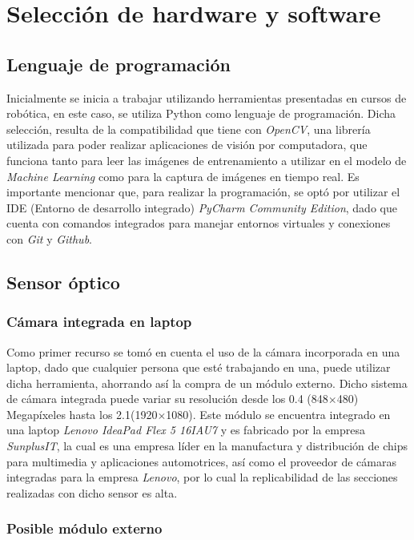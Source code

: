 \chapter{Selección de hardware y software}

\section{Lenguaje de programación}
Inicialmente se inicia a trabajar utilizando herramientas presentadas en cursos de robótica, en este caso, se utiliza Python como lenguaje de programación. Dicha selección, resulta de la compatibilidad que tiene con \textit{OpenCV}, una librería utilizada para poder realizar aplicaciones de visión por computadora, que funciona tanto para leer las imágenes de entrenamiento a utilizar en el modelo de \textit{Machine Learning} como para la captura de imágenes en tiempo real. Es importante mencionar que, para realizar la programación, se optó por utilizar el IDE (Entorno de desarrollo integrado) \textit{PyCharm Community Edition}, dado que cuenta con comandos integrados para manejar entornos virtuales y conexiones con \textit{Git} y \textit{Github}.


\section{Sensor óptico}
\subsection{Cámara integrada en laptop}
Como primer recurso se tomó en cuenta el uso de la cámara incorporada en una laptop, dado que cualquier persona que esté trabajando en una, puede utilizar dicha herramienta, ahorrando así la compra de un módulo externo. Dicho sistema de cámara integrada puede variar su resolución desde los 0.4 (848$\times$480) Megapíxeles hasta los 2.1(1920$\times$1080). Este módulo se encuentra integrado en una laptop \textit{Lenovo IdeaPad Flex 5 16IAU7} y es fabricado por la empresa \textit{SunplusIT}, la cual es una empresa líder en la manufactura y distribución de chips para multimedia y aplicaciones automotrices, así como el proveedor de cámaras integradas para la empresa \textit{Lenovo}, por lo cual la replicabilidad de las secciones realizadas con dicho sensor es alta.

\subsection{Posible módulo externo}

